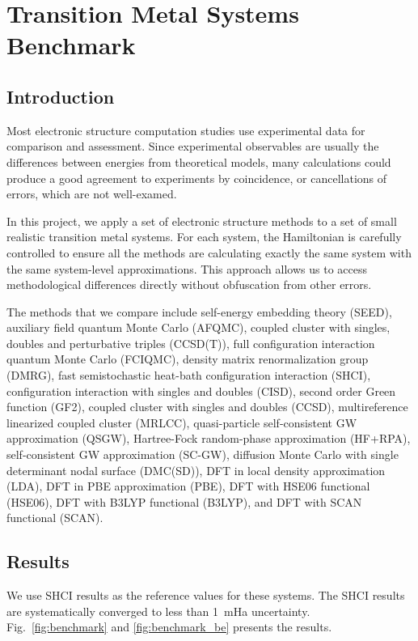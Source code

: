 \chapter{Transition Metal Systems Benchmark}
\label{ch:benchmark}
\section{Introduction}
Most electronic structure computation studies use experimental data for comparison and assessment.
Since experimental observables are usually the differences between energies from theoretical models, many calculations could produce a good agreement to experiments by coincidence, or cancellations of errors, which are not well-examed.

In this project, we apply a set of electronic structure methods to a set of small realistic transition metal systems.
For each system, the Hamiltonian is carefully controlled to ensure all the methods are calculating exactly the same system with the same system-level approximations.
This approach allows us to access methodological differences directly without obfuscation from other errors.

The methods that we compare include self-energy embedding theory (SEED), auxiliary field quantum Monte Carlo (AFQMC), coupled cluster with singles, doubles and perturbative triples (CCSD(T)), full configuration interaction quantum Monte Carlo (FCIQMC), density matrix renormalization group (DMRG), fast semistochastic heat-bath configuration interaction (SHCI), configuration interaction with singles and doubles (CISD), second order Green function (GF2), coupled cluster with singles and doubles (CCSD), multireference linearized coupled cluster (MRLCC), quasi-particle self-consistent GW approximation (QSGW), Hartree-Fock random-phase approximation (HF+RPA),  self-consistent GW approximation (SC-GW), diffusion Monte Carlo with single determinant nodal surface (DMC(SD)), DFT in local density approximation (LDA), DFT in PBE approximation (PBE), DFT with HSE06 functional (HSE06), DFT with B3LYP functional (B3LYP), and DFT with SCAN functional (SCAN).

\section{Results}

We use SHCI results as the reference values for these systems.
The SHCI results are systematically converged to less than 1~mHa uncertainty.
Fig.~\ref{fig:benchmark} and \ref{fig:benchmark_be} presents the results.

